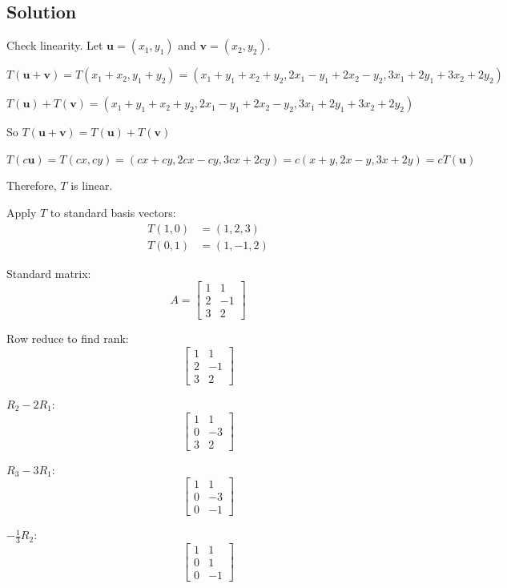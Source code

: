 \documentclass[12pt]{article}
\begin{document}
\subsection*{Solution}

Check linearity. Let $\mathbf{u} = (x_1, y_1)$ and $\mathbf{v} = (x_2, y_2)$.

$T(\mathbf{u} + \mathbf{v}) = T(x_1 + x_2, y_1 + y_2) = (x_1 + y_1 + x_2 + y_2, 2x_1 - y_1 + 2x_2 - y_2, 3x_1 + 2y_1 + 3x_2 + 2y_2)$

$T(\mathbf{u}) + T(\mathbf{v}) = (x_1 + y_1 + x_2 + y_2, 2x_1 - y_1 + 2x_2 - y_2, 3x_1 + 2y_1 + 3x_2 + 2y_2)$

So $T(\mathbf{u} + \mathbf{v}) = T(\mathbf{u}) + T(\mathbf{v})$

$T(c\mathbf{u}) = T(cx, cy) = (cx + cy, 2cx - cy, 3cx + 2cy) = c(x + y, 2x - y, 3x + 2y) = cT(\mathbf{u})$

Therefore, $T$ is linear.

Apply $T$ to standard basis vectors:
\begin{align*}
	T(1,0) &= (1, 2, 3) \\
	T(0,1) &= (1, -1, 2)
\end{align*}

Standard matrix:
\[
	A = \begin{bmatrix}
		1 & 1 \\
		2 & -1 \\
		3 & 2
	\end{bmatrix}
\]

Row reduce to find rank:
\[
	\begin{bmatrix}
		1 & 1 \\
		2 & -1 \\
		3 & 2
	\end{bmatrix}
\]

$R_2 - 2R_1$:
\[
	\begin{bmatrix}
		1 & 1 \\
		0 & -3 \\
		3 & 2
	\end{bmatrix}
\]

$R_3 - 3R_1$:
\[
	\begin{bmatrix}
		1 & 1 \\
		0 & -3 \\
		0 & -1
	\end{bmatrix}
\]

$-\frac{1}{3}R_2$:
\[
	\begin{bmatrix}
		1 & 1 \\
		0 & 1 \\
		0 & -1
	\end{bmatrix}
\]
\end{document}
